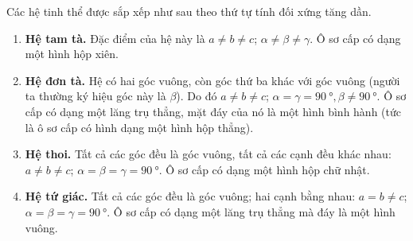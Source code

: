 
Các hệ tinh thể được sắp xếp như sau theo thứ tự tính đối xứng tăng dần.
\begin{enumerate}[1.]


	\item \textbf{Hệ tam tà.} Đặc điểm của hệ này là $a\neq b\neq c$; $\alpha\neq\beta\neq\gamma$. Ô sơ cấp có dạng một hình hộp xiên.


	\item \textbf{Hệ đơn tà.} Hệ có hai góc vuông, còn góc thứ ba khác với góc vuông (người ta thường ký hiệu góc này là $\beta$). Do đó $a\neq b\neq c$; $\alpha=\gamma=\SI{90}{\degree}, \beta\neq\SI{90}{\degree}$.  Ô sơ cấp có dạng một lăng trụ thẳng, mặt đáy của nó là một hình bình hành (tức là ô sơ cấp có hình dạng một hình hộp thẳng).


	\item \textbf{Hệ thoi.} Tất cả các góc đều là góc vuông, tất cả các cạnh đều khác nhau: $a\neq b\neq c$; $\alpha=\beta=\gamma=\SI{90}{\degree}$. Ô sơ cấp có dạng một hình hộp chữ nhật.


	\item \textbf{Hệ tứ giác.} Tất cả các góc đều là góc vuông; hai cạnh bằng nhau: $a=b\neq c$; $\alpha=\beta=\gamma=\SI{90}{\degree}$. Ô sơ cấp có dạng một lăng trụ thẳng mà đáy là một hình vuông.


\end{enumerate}
